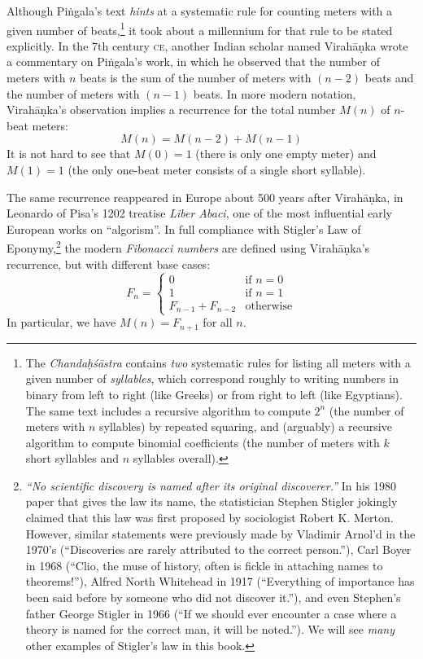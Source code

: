 Although Pi\.{n}gala’s text \textit{hints} at a systematic rule for counting meters with a given number of beats,\footnote{The \textit{Chanda\d{h}\'s\=astra} contains \textit{two} systematic rules for listing all meters with a given number of \textit{syllables}, which correspond roughly to writing numbers in binary from left to right (like Greeks) or from right to left (like Egyptians). The same text includes a recursive algorithm to compute $2^n$ (the number of meters with $n$ syllables) by repeated squaring, and (arguably) a recursive algorithm to compute binomial coefficients (the number of meters with $k$ short syllables and $n$ syllables overall).} it took about a millennium for that rule to be stated explicitly.
In the 7th century \textsc{ce}, another Indian scholar named Virah\=a\d{n}ka wrote a commentary on Pi\.{n}gala’s work, in which he observed that the number of meters with $n$ beats is the sum of the number of meters with $(n-2)$ beats and the number of meters with $(n-1)$ beats.
In more modern notation, Virah\=a\d{n}ka’s observation implies a recurrence for the total number $M(n)$ of $n$-beat meters:
\[
M(n) = M(n-2) + M(n-1)
\]
It is not hard to see that $M(0) = 1$ (there is only one empty meter) and $M(1) = 1$ (the only one-beat meter consists of a single short syllable).

The same recurrence reappeared in Europe about 500 years after Virah\=a\d{n}ka, in Leonardo of Pisa’s 1202 treatise \textit{Liber Abaci}, one of the most influential early European works on “algorism”.
In full compliance with Stigler’s Law of Eponymy,\footnote{\textit{“No scientific discovery is named after its original discoverer.”} In his 1980 paper that gives the law its name, the statistician Stephen Stigler jokingly claimed that this law was first proposed by sociologist Robert K. Merton. However, similar statements were previously made by Vladimir Arnol’d in the 1970’s (“Discoveries are rarely attributed to the correct person.”), Carl Boyer in 1968 (“Clio, the muse of history, often is fickle in attaching names to theorems!”), Alfred North Whitehead in 1917 (“Everything of importance has been said before by someone who did not discover it.”), and even Stephen’s father George Stigler in 1966 (“If we should ever encounter a case where a theory is named for the correct man, it will be noted.”). We will see \textit{many} other examples of Stigler’s law in this book.} the modern \textit{Fibonacci numbers} are defined using Virah\=a\d{n}ka’s recurrence, but with different base cases:
\[
F_n = \begin{cases}
0 & \text{if } n = 0\\
1 & \text{if } n = 1\\
F_{n-1} + F_{n-2} & \text{otherwise}
\end{cases}
\]
In particular, we have $M(n) = F_{n+1}$ for all $n$.

